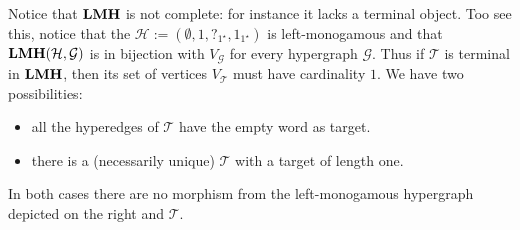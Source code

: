 \documentclass[3p]{elsarticle}
\newcommand{\catname}[1]{\textbf{\textup{#1}}}
\newcommand{\lmo}{\catname{LMH}}
\theoremstyle{remark}
\theoremstyle{definition}
\begin{document}
\begin{rem}\label{rem:con}Notice that  $\lmo$ is not complete: for instance it lacks a terminal object. Too see this, notice that the $\mathcal{H}:=(\emptyset, 1, ?_{1^\star}, 1_{1^\star} )$ is left-monogamous and that 
	$\lmo(\mathcal{H}, \mathcal{G})$ is in bijection with $V_{\mathcal{G}}$ for every hypergraph $\mathcal{G}$. Thus if  $\mathcal{T}$ is terminal in $\lmo$, then its set of vertices $V_{\mathcal{T}}$ must have cardinality $1$.  We have two possibilities:
	
	\medskip 
	\begin{minipage}[l]{.65\linewidth}
		\begin{itemize}
			\item  all the hyperedges of $\mathcal{T}$ have the empty word as target.
			\item there is a (necessarily unique) $\mathcal{T}$ with a target of length one.
		\end{itemize}
	\end{minipage}
	\begin{minipage}[r]{.15\linewidth}
	\end{minipage}
	
	\medskip
	In both cases there are no morphism from the left-monogamous hypergraph depicted on the right and $\mathcal{T}$. 
\end{rem}
\end{document}

